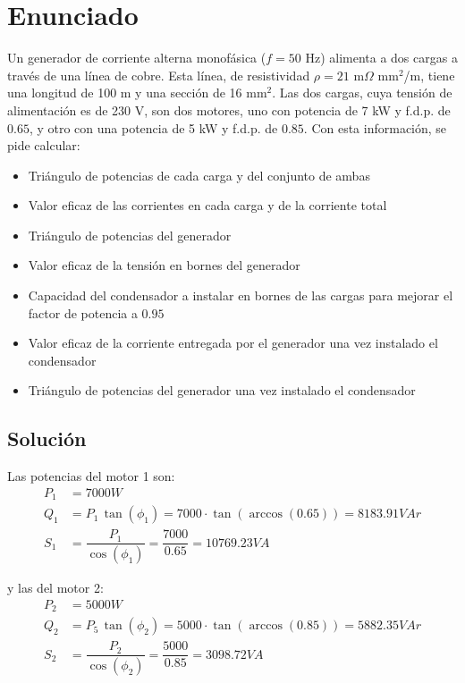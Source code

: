 
\section{Enunciado}
                                              
Un generador de corriente alterna monofásica ($f=50$ Hz) alimenta a dos
cargas a través de una línea de cobre. Esta línea, de resistividad
$\rho=21$ m$\Omega$ mm$^2$/m, tiene una longitud de 100 m y una sección
de 16 mm$^2$. Las dos cargas, cuya tensión de alimentación es de 230 V,
son dos motores, uno con potencia de 7 kW y f.d.p. de $0.65$, y otro con
una potencia de 5 kW y f.d.p. de $0.85$. Con esta información, se pide
calcular:
\begin{itemize}
\item Triángulo de potencias de cada carga y del conjunto de ambas
\item Valor eficaz de las corrientes en cada carga y de la corriente
  total
\item Triángulo de potencias del generador
\item Valor eficaz de la tensión en bornes del generador
\item Capacidad del condensador a instalar en bornes de las cargas para
  mejorar el factor de potencia a $0.95$
\item Valor eficaz de la corriente entregada por el generador una vez
  instalado el condensador
\item Triángulo de potencias del generador una vez instalado el
  condensador
\end{itemize}

\subsection*{Solución}

Las potencias del motor 1 son:
\begin{align*}
  P_1&=7000W\\ Q_1&=P_1\,\tan(\phi_1)=7000\cdot
                    \tan(\arccos(0.65))=8183.91VAr\\
  S_1&=\dfrac{P_1}{\cos(\phi_1)}=\dfrac{7000}{0.65}=10769.23VA
\end{align*}

y las del motor 2:
\begin{align*}
  P_2&=5000W\\ Q_2&=P_5\,\tan(\phi_2)=5000\cdot
                    \tan(\arccos(0.85))=5882.35VAr\\
  S_2&=\dfrac{P_2}{\cos(\phi_2)}=\dfrac{5000}{0.85}=3098.72VA
\end{align*}

